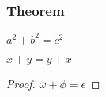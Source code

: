 \begin{frame}\frametitle{Theorem}

\begin{theorem}[Pythagoras] 
$ a^2 + b^2 = c^2$
\end{theorem}
\begin{corollary}
$ x + y = y + x  $
\end{corollary}
\begin{proof}
$\omega +\phi = \epsilon $
\end{proof}

\end{frame}